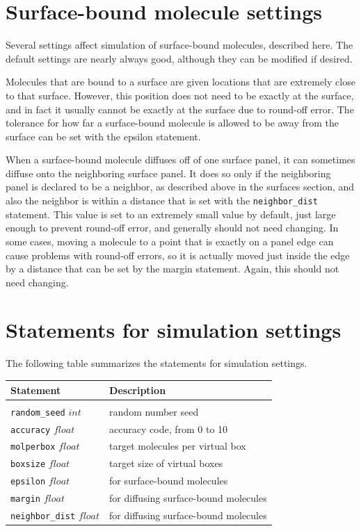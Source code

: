 \documentclass {scrbook}
\newcommand {\ttt} {\texttt}
\begin{document}
\section{Surface-bound molecule settings}

Several settings affect simulation of surface-bound molecules, described here. The default settings are nearly always good, although they can be modified if desired.

Molecules that are bound to a surface are given locations that are extremely close to that surface. However, this position does not need to be exactly at the surface, and in fact it usually cannot be exactly at the surface due to round-off error. The tolerance for how far a surface-bound molecule is allowed to be away from the surface can be set with the epsilon statement.

When a surface-bound molecule diffuses off of one surface panel, it can sometimes diffuse onto the neighboring surface panel. It does so only if the neighboring panel is declared to be a neighbor, as described above in the surfaces section, and also the neighbor is within a distance that is set with the \ttt{neighbor\_dist} statement. This value is set to an extremely small value by default, just large enough to prevent round-off error, and generally should not need changing. In some cases, moving a molecule to a point that is exactly on a panel edge can cause problems with round-off errors, so it is actually moved just inside the edge by a distance that can be set by the margin statement. Again, this should not need changing.

\section{Statements for simulation settings}

The following table summarizes the statements for simulation settings.

\begin{longtable}[c]{ll}
Statement & Description\\
\hline \\
\ttt{random\_seed} $int$ & random number seed\\
\ttt{accuracy} $float$ & accuracy code, from 0 to 10\\
\ttt{molperbox} $float$ & target molecules per virtual box\\
\ttt{boxsize} $float$ & target size of virtual boxes\\
\ttt{epsilon} $float$ & for surface-bound molecules\\
\ttt{margin} $float$ & for diffusing surface-bound molecules\\
\ttt{neighbor\_dist} $float$ & for diffusing surface-bound molecules
\end{longtable}
\end{document}
